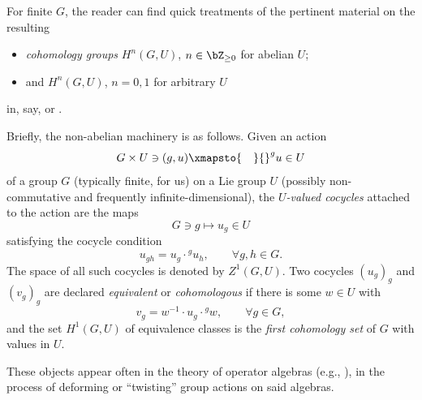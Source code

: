 For finite $G$, the reader can find quick treatments of the pertinent material on the resulting
\begin{itemize}\itemsep=0pt
\item {\it cohomology groups} $H^n(G,U)$, $n\in \bZ_{\ge 0}$ for abelian $U$;
\item and $H^n(G,U)$, $n=0,1$ for arbitrary $U$
\end{itemize}
in, say, \cite[Chapter VII and its Appendix]{ser-lf} or \cite[Sections~I.2 and I.5]{ser-gal}.

Briefly, the non-abelian machinery is as follows. Given an action
\begin{equation}\label{eq:gactu}
 G\times U\ni (g,u)\xmapsto{\quad} {}^gu\in U
\end{equation}
of a group $G$ (typically finite, for us) on a Lie group $U$ (possibly non-commutative and frequently infinite-dimensional), the {\it $U$-valued cocycles} attached to the action are the maps
\begin{equation}\label{eq:gtoug}
 G\ni g\mapsto u_g\in U
\end{equation}
satisfying the cocycle condition
\begin{equation}\label{eq:cocyccond}
 u_{gh} = u_g\cdot {}^g u_h,\qquad \forall g,h\in G.
\end{equation}
The space of all such cocycles is denoted by $Z^1(G,U)$. Two cocycles $(u_g)_g$ and $(v_g)_g$ are declared {\it equivalent} or {\it cohomologous} if there is some $w\in U$ with
\begin{equation*}
 v_g = w^{-1}\cdot u_g\cdot {}^g w,\qquad \forall g\in G,
\end{equation*}
and the set $H^1(G,U)$ of equivalence classes is the {\it first cohomology set} of $G$ with values in $U$.

These objects appear often in the theory of operator algebras (e.g., \cite[Definition X.1.4]{tak2}), in the process of deforming or ``twisting'' group actions on said algebras.

